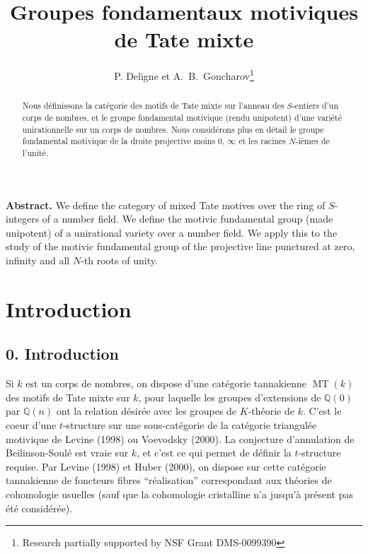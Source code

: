 \documentclass[11pt,a4paper]{article}
\theoremstyle{plain}
\theoremstyle{definition}
\theoremstyle{remark}
\DeclareMathOperator{\MT}{MT}
\newcommand{\dbQ}{\mathbb{Q}}
\begin{document}
\title{Groupes fondamentaux motiviques de Tate mixte}
\author{P. Deligne et A.~B.~Goncharov\thanks{Research partially supported by NSF Grant DMS-0099390}}
\date{}
\maketitle

\begin{abstract}
\noindent
Nous d\'efinissons la cat\'egorie des motifs de Tate mixte sur l'anneau des $S$-entiers d'un corps de nombres, et le groupe fondamental motivique (rendu unipotent) d'une vari\'et\'e unirationnelle sur un corps de nombres. Nous consid\'erons plus en d\'etail le groupe fondamental motivique de la droite projective moins $0$, $\infty$ et les racines $N$-i\`emes de l'unit\'e.
\end{abstract}

\bigskip
\noindent\textbf{Abstract.} We define the category of mixed Tate motives over the ring of $S$-integers of a number field. We define the motivic fundamental group (made unipotent) of a unirational variety over a number field. We apply this to the study of the motivic fundamental group of the projective line punctured at zero, infinity and all $N$-th roots of unity.

\tableofcontents

\section*{Introduction}


\clearpage


\subsection*{0. Introduction}


Si $k$ est un corps de nombres, on dispose
d'une cat\'egorie tannakienne $\MT(k)$
des motifs de Tate mixte sur $k$, pour laquelle
les groupes d'extensions de $\dbQ(0)$
par $\dbQ(n)$ ont la relation d\'esir\'ee avec
les groupes de $K$-th\'eorie de $k$.
C'est le coeur d'une $t$-structure sur une
sous-cat\'egorie de la cat\'egorie
triangul\'ee motivique de Levine (1998) ou
Voevodsky (2000). 
La conjecture d'annulation de
Beilinson-Soul\'e est vraie sur $k$, et c'est
ce qui permet de d\'efinir la $t$-structure
requise.
Par Levine (1998) et Huber (2000), on
dispose sur cette cat\'egorie tannakienne de
foncteurs fibres ``r\'ealisation''
correspondant aux th\'eories de cohomologie
usuelles (sauf que la cohomologie cristalline
n'a jusqu'\`a pr\'esent pas \'et\'e
consid\'er\'ee).
\end{document}
